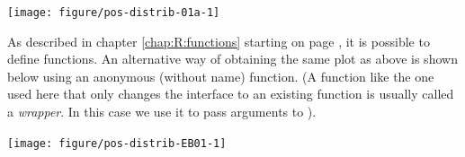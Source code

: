 \documentclass[krantz2]{krantz}\usepackage{knitr}%
\begin{document}
\begin{knitrout}\footnotesize
{}\color{fgcolor}\begin{kframe}
\begin{alltt}
 \hlkwb{<-} \hlstd{(} \hlstd{=} \hlopt{-}\hlstd{,}  \hlstd{=} \hlstd{,}  \hlstd{=} \hlstd{)}

 \hlkwb{<-} \hlstd{(} 
                       \hlstd{=} \hlstd{(}   \hlstd{=} \hlstd{,}  \hlstd{=} \hlstd{))}
\hlopt{~}    \hlstd{=} \hlstd{)}
\end{alltt}
\end{kframe}

{\centering \texttt{[image: figure/pos-distrib-01a-1]} 

}



\end{knitrout}

\begin{explainbox}
As described in chapter \ref{chap:R:functions} starting on page \pageref{chap:R:functions}, it is possible to define functions. An alternative way of obtaining the same plot as above is shown below using an anonymous (without name) function. (A function like the one used here that only changes the interface to an existing function is usually called a \emph{wrapper}. In this case we use it to pass arguments to ).

\begin{knitrout}\footnotesize
{}\color{fgcolor}\begin{kframe}
\begin{alltt}
\hlstd{(} \hlstd{=} \hlstd{(}\hlstd{)}   \hlstd{=} \hlstd{,}  \hlstd{=} \hlstd{),}
      \hlstd{=} \hlopt{-}\hlstd{,}  \hlstd{=} \hlstd{,}  \hlstd{=} \hlstd{)}
\end{alltt}
\end{kframe}

{\centering \texttt{[image: figure/pos-distrib-EB01-1]} 

}



\end{knitrout}
\end{explainbox}
\end{document}
